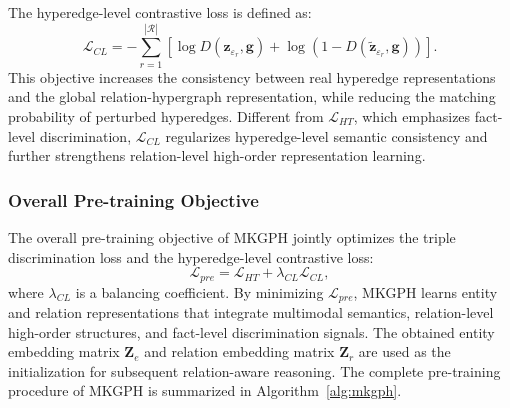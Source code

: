 \documentclass[a4paper,fleqn]{cas-sc}
\begin{document}
The hyperedge-level contrastive loss is defined as:
\begin{equation}
\mathcal{L}_{CL}
=
-\sum_{r=1}^{|\mathcal{R}|}
\left[
\log
D
\left(
\mathbf{z}_{\varepsilon_r},
\mathbf{g}
\right)
+
\log
\left(
1-
D
\left(
\widetilde{\mathbf{z}}_{\varepsilon_r},
\mathbf{g}
\right)
\right)
\right].
\end{equation}
This objective increases the consistency between real hyperedge representations and the global relation-hypergraph representation, while reducing the matching probability of perturbed hyperedges. Different from $\mathcal{L}_{HT}$, which emphasizes fact-level discrimination, $\mathcal{L}_{CL}$ regularizes hyperedge-level semantic consistency and further strengthens relation-level high-order representation learning. 

\subsubsection{Overall Pre-training Objective}

The overall pre-training objective of MKGPH jointly optimizes the triple discrimination loss and the hyperedge-level contrastive loss:
\begin{equation}
\mathcal{L}_{pre}
=
\mathcal{L}_{HT}
+
\lambda_{CL}\mathcal{L}_{CL},
\end{equation}
where $\lambda_{CL}$ is a balancing coefficient. By minimizing $\mathcal{L}_{pre}$, MKGPH learns entity and relation representations that integrate multimodal semantics, relation-level high-order structures, and fact-level discrimination signals. The obtained entity embedding matrix $\mathbf{Z}_{e}$ and relation embedding matrix $\mathbf{Z}_{r}$ are used as the initialization for subsequent relation-aware reasoning. The complete pre-training procedure of MKGPH is summarized in Algorithm~\ref{alg:mkgph}.
\end{document}

